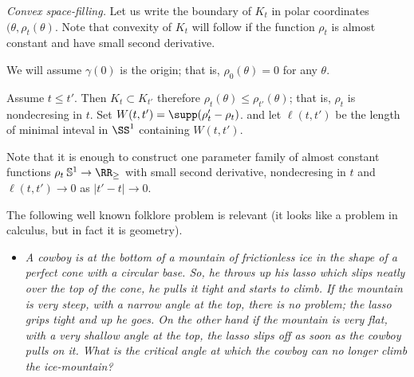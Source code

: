 \textit{Convex space-filling.}
Let us write the boundary of $K_t$
in polar coordinates $(\theta,\rho_t(\theta)$.
Note that convexity of $K_t$ will follow if the function $\rho_t$ is almost constant and have small second derivative.

We will assume $\gamma(0)$ is the origin;
that is, $\rho_0(\theta)=0$ for any $\theta$.

Assume $t\le t'$.
Then $K_t\subset K_{t'}$ 
therefore 
$\rho_t(\theta)\le \rho_{t'}(\theta)$;
that is, $\rho_t$ is nondecresing in $t$.
Set $W(t,t')=\supp(\rho_t'-\rho_t)$.
and let $\ell(t,t')$ be the length of minimal inteval in $\SS^1$ containing $W(t,t')$.

Note that it is enough to construct one parameter family of almost constant functions $\rho_t\:\mathbb{S}^1\to \RR_\ge$
with small second derivative,
nondecresing in $t$ and $\ell(t,t')\to 0$ as $|t'-t|\to 0$.















The following well known folklore problem is relevant
(it looks like a problem in calculus, but in fact it is geometry).

\begin{itemize}
\item \textit{ 
A cowboy is at the bottom of a mountain of frictionless ice in the shape of a perfect cone with a circular base. 
So, he throws up his lasso which slips neatly over the top of the cone, he pulls it tight and starts to climb. If the mountain is very steep, with a narrow angle at the top, there is no problem; the lasso grips tight and up he goes. On the other hand if the mountain is very flat, with a very shallow angle at the top, the lasso slips off as soon as the cowboy pulls on it. 
What is the critical angle at which the cowboy can no longer climb the ice-mountain?}
\end{itemize}



